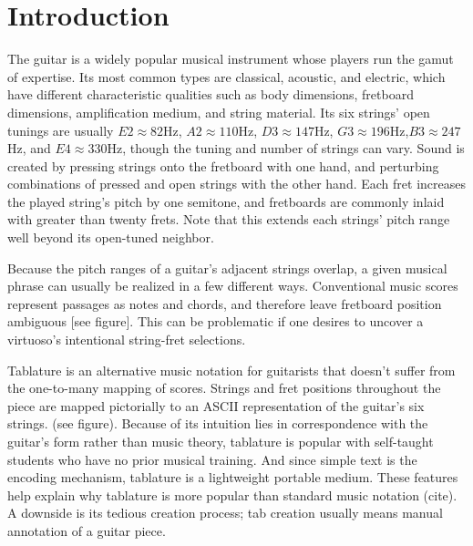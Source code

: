 \documentclass[12pt]{cmuthesis}
\begin{document}
%
%
%
%
%


\chapter{Introduction}
\doublespacing

The guitar is a widely popular musical instrument whose players run the gamut of expertise. Its most common types are classical, acoustic, and electric, which have different characteristic qualities such as body dimensions, fretboard dimensions, amplification medium, and string material. Its six strings' open tunings are usually $E2 \approx 82$Hz, $A2 \approx 110$Hz, $D3 \approx 147$Hz, $G3 \approx196$Hz,$ B3 \approx 247$Hz, and $E4 \approx 330$Hz, though the tuning and number of strings can vary. Sound is created by pressing strings onto the fretboard with one hand, and perturbing combinations of pressed and open strings with the other hand. Each fret increases the played string's pitch by one semitone, and fretboards are commonly inlaid with greater than twenty frets. Note that this extends each strings' pitch range well beyond its open-tuned neighbor.

Because the pitch ranges of a guitar's adjacent strings overlap, a given musical phrase can usually be realized in a few different ways. Conventional music scores represent passages as notes and chords, and therefore leave fretboard position ambiguous [see figure]. This can be problematic if one desires to uncover a virtuoso's intentional string-fret selections.

Tablature is an alternative music notation for guitarists that doesn't suffer from the one-to-many mapping of scores. Strings and fret positions throughout the piece are mapped pictorially to an ASCII representation of the guitar's six strings. (see figure). Because of its intuition lies in correspondence with the guitar's form rather than music theory, tablature is popular with self-taught students who have no prior musical training. And since simple text is the encoding mechanism, tablature is a lightweight portable medium. These features help explain why tablature is more popular than standard music notation (cite). A downside is its tedious creation process; tab creation usually means manual annotation of a guitar piece.
\end{document}
